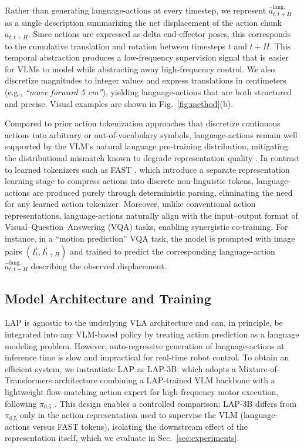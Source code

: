 Rather than generating language-actions at every timestep, we represent $\hat{a}_{t:t+H}^{\text{lang.}}$ as a single description summarizing the net displacement of the action chunk $a_{t:t+H}$. Since actions are expressed as delta end-effector poses, this corresponds to the cumulative translation and rotation between timesteps $t$ and $t+H$. This temporal abstraction produces a low-frequency supervision signal that is easier for VLMs to model while abstracting away high-frequency control. We also discretize magnitudes to integer values and express translations in centimeters (e.g., \emph{``move forward 5 cm''}), yielding language-actions that are both structured and precise. Visual examples are shown in Fig.~\ref{fig:method}(b).

Compared to prior action tokenization approaches that discretize continuous actions into arbitrary or out-of-vocabulary symbols, language-actions remain well supported by the VLM’s natural language pre-training distribution, mitigating the distributional mismatch known to degrade representation quality \cite{hancock2025actionslanguagefinetuningvlms, driess2025knowledgeinsulatingvisionlanguageactionmodels}. In contrast to learned tokenizers such as FAST \cite{pertsch2025fastefficientactiontokenization}, which introduce a separate representation learning stage to compress actions into discrete non-linguistic tokens, language-actions are produced purely through deterministic parsing, eliminating the need for any learned action tokenizer. Moreover, unlike conventional action representations, language-actions naturally align with the input–output format of Visual--Question--Answering (VQA) tasks, enabling synergistic co-training. For instance, in a ``motion prediction'' VQA task, the model is prompted with image pairs $(I_t^i, I_{t+H}^i)$ and trained to predict the corresponding language-action $\hat{a}_{t:t+H}^{\text{lang.}}$ describing the observed displacement.


\subsection{Model Architecture and Training}
\label{subsec:architecture}

LAP is agnostic to the underlying VLA architecture and can, in principle, be integrated into any VLM-based policy by treating action prediction as a language modeling problem. However, auto-regressive generation of language-actions at inference time is slow and impractical for real-time robot control. To obtain an efficient system, we instantiate LAP as LAP-3B, which adopts a Mixture-of-Transformers architecture \cite{liang2024mixture} combining a LAP-trained VLM backbone with a lightweight flow-matching action expert for high-frequency motor execution, following $\pi_{0.5}$ \cite{intelligence2025pi05visionlanguageactionmodelopenworld}. This design enables a controlled comparison: \textsc{LAP-3B} differs from $\pi_{0.5}$ only in the action representation used to supervise the VLM (language-actions versus FAST tokens), isolating the downstream effect of the representation itself, which we evaluate in Sec.~\ref{sec:experiments}.

